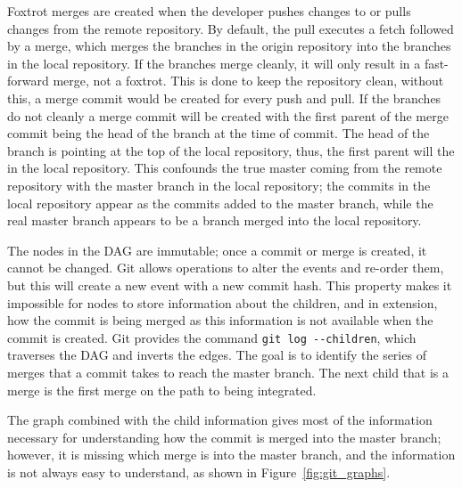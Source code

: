 Foxtrot merges are created when the developer pushes changes to or pulls
changes from the remote repository.
By default, the pull executes a fetch followed by a merge, which merges
the branches in the origin repository into the branches in the local
repository.
If the branches merge cleanly, it will only result in a fast-forward
merge, not a foxtrot.
This is done to keep the repository clean, without this, a merge commit
would be created for every push and pull.
If the branches do not cleanly a merge commit will be created with the
first parent of the merge commit being the head of the branch at the
time of commit.
The head of the branch is pointing at the top of the
local repository, thus, the first parent will the in the local
repository.
This confounds the true master coming from the remote repository with
the master branch in the local repository; the commits in the local
repository appear as the commits added to the master branch, while the real
master branch appears to be a branch merged into the local repository.

The nodes in the DAG are immutable; once a commit or merge is created,
it cannot be changed. Git allows operations to alter the events and
re-order them, but this will create a new event with a new commit hash.
This property makes it impossible for nodes to store information about
the children, and in extension, how the commit is being merged as this
information is not available when the commit is created.
Git provides the command \verb|git log --children|, which traverses the
DAG and inverts the edges.
The goal is to identify the series of merges that a commit takes to
reach the master branch.
The next child that is a merge is the first merge on the path to being
integrated.

The graph combined with the child information gives most of the
information necessary for understanding how the commit is
merged into the master branch; however, it is missing which merge is
into the master branch, and the information is not always easy to
understand, as shown in Figure~\ref{fig:git_graphs}.

